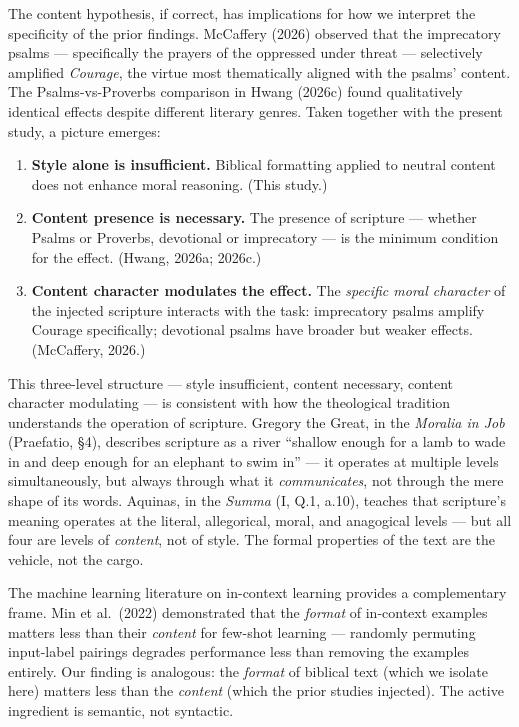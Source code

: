 \documentclass[10pt, letterpaper, twocolumn]{article}
\providecommand{\tightlist}{\setlength{\itemsep}{0pt}\setlength{\parskip}{0pt}}
\begin{document}
The content hypothesis, if correct, has implications for how we interpret the specificity of the prior findings. McCaffery (2026) observed that the imprecatory psalms --- specifically the prayers of the oppressed under threat --- selectively amplified \emph{Courage}, the virtue most thematically aligned with the psalms' content. The Psalms-vs-Proverbs comparison in Hwang (2026c) found qualitatively identical effects despite different literary genres. Taken together with the present study, a picture emerges:

\begin{enumerate}
\def\labelenumi{\arabic{enumi}.}
\tightlist
\item
  \textbf{Style alone is insufficient.} Biblical formatting applied to neutral content does not enhance moral reasoning. (This study.)
\item
  \textbf{Content presence is necessary.} The presence of scripture --- whether Psalms or Proverbs, devotional or imprecatory --- is the minimum condition for the effect. (Hwang, 2026a; 2026c.)
\item
  \textbf{Content character modulates the effect.} The \emph{specific moral character} of the injected scripture interacts with the task: imprecatory psalms amplify Courage specifically; devotional psalms have broader but weaker effects. (McCaffery, 2026.)
\end{enumerate}

This three-level structure --- style insufficient, content necessary, content character modulating --- is consistent with how the theological tradition understands the operation of scripture. Gregory the Great, in the \emph{Moralia in Job} (Praefatio, §4), describes scripture as a river ``shallow enough for a lamb to wade in and deep enough for an elephant to swim in'' --- it operates at multiple levels simultaneously, but always through what it \emph{communicates}, not through the mere shape of its words. Aquinas, in the \emph{Summa} (I, Q.1, a.10), teaches that scripture's meaning operates at the literal, allegorical, moral, and anagogical levels --- but all four are levels of \emph{content}, not of style. The formal properties of the text are the vehicle, not the cargo.

The machine learning literature on in-context learning provides a complementary frame. Min et al.~(2022) demonstrated that the \emph{format} of in-context examples matters less than their \emph{content} for few-shot learning --- randomly permuting input-label pairings degrades performance less than removing the examples entirely. Our finding is analogous: the \emph{format} of biblical text (which we isolate here) matters less than the \emph{content} (which the prior studies injected). The active ingredient is semantic, not syntactic.
\end{document}
